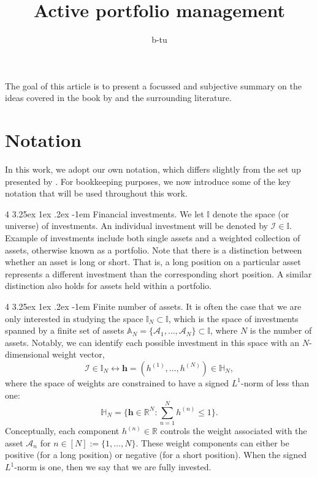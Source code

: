 \documentclass[12pt]{article}
\title{Active portfolio management}
\author{
	b-tu
}
\makeatletter
\renewcommand\paragraph{%
	\@startsection{paragraph}
	{4}
	{\z@}
	{3.25ex \@plus1ex \@minus.2ex}
	{-1em}
	{\normalfont\normalsize\bfseries\maybe@addperiod}%
}
\newcommand{\maybe@addperiod}[1]{%
	#1\@addpunct{.}%
}
\makeatother
\begin{document}
\maketitle
The goal of this article is to present a focussed and subjective summary on the ideas covered in the book by \cite{grinold1999} and the surrounding literature.
\section{Notation}
In this work, we adopt our own notation, which differs slightly from the set up presented by \cite{grinold1999}. For bookkeeping purposes, we now introduce some of the key notation that will be used throughout this work.

\paragraph{Financial investments.} We let $\mathbb{I}$ denote the space (or universe) of investments. An individual investment will be denoted by $\mathcal{I} \in \mathbb{I}$. Example of investments include both single assets and a weighted collection of assets, otherwise known as a portfolio. Note that there is a distinction between whether an asset is long or short. That is, a long position on a particular asset represents a different investment than the corresponding short position. A similar distinction also holds for assets held within a portfolio.

\paragraph{Finite number of assets.} It is often the case that we are only interested in studying the space $\mathbb{I}_{N} \subset \mathbb{I}$, which is the space of investments spanned by a finite set of assets $\mathbb{A}_N = \{\mathcal{A}_1, \dots, \mathcal{A}_N\} \subset \mathbb{I}$, where $N$ is the number of assets. Notably, we can identify each possible investment in this space with an $N$-dimensional weight vector, 
\begin{equation}
	\mathcal{I} \in \mathbb{I}_N \longleftrightarrow \mathbf{h} = (h^{(1)}, \dots, h^{(N)}) \in \mathbb{H}_N,
\end{equation}
where the space of weights are constrained to have a signed $L^1$-norm of less than one:
\begin{equation}
	\mathbb{H}_N = \bigg\{\mathbf{h} \in \mathbb{R}^N: \sum_{n=1}^N h^{(n)} \leq 1 \bigg\}.
\end{equation}
Conceptually, each component $h^{(n)} \in \mathbb{R}$ controls the weight associated with the asset $\mathcal{A}_n$ for $n \in [N] := \{1,\dots,N\}$. These weight components can either be positive (for a long position) or negative (for a short position). When the signed $L^1$-norm is one, then we say that we are fully invested.
\end{document}
